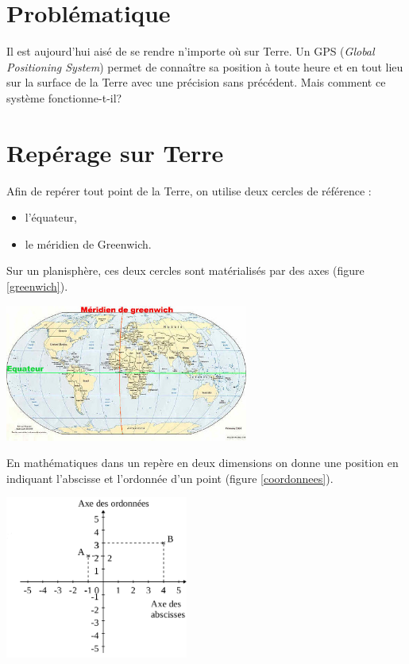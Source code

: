 \documentclass[a4paper,11pt]{article}
\begin{document}
\section{Problématique}
Il est aujourd'hui aisé de se rendre n'importe où sur Terre. Un GPS (\emph{Global Positioning System}) permet de connaître sa position à toute heure et en tout lieu sur la surface de la Terre avec une précision sans précédent. Mais comment ce système fonctionne-t-il?
\begin{center}
\end{center}
\section{Repérage sur Terre}
Afin de repérer tout point de la Terre, on utilise deux cercles de référence :
\begin{itemize}
    \item l’équateur,
    \item le méridien de Greenwich.
\end{itemize}
Sur un planisphère, ces deux cercles sont matérialisés par des axes (figure \ref{greenwich}).
\begin{center}
    \centering
    \includegraphics[width=8cm]{ressources/greenwich.jpg}
    \label{greenwich}
\end{center}
En mathématiques dans un repère en deux dimensions on donne une position en indiquant l'abscisse et l'ordonnée d'un point (figure \ref{coordonnees}).
\begin{center}
    \centering
    \includegraphics[width=6cm]{ressources/coordonnees.png}
    \label{coordonnees}
\end{center}
\end{document}
